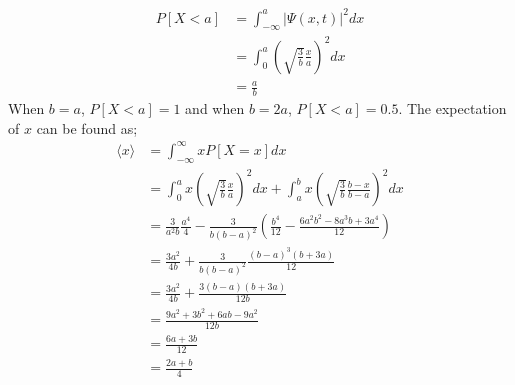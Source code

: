 \documentclass[addpoints]{exam}
\begin{document}
\begin{questions}
\begin{solution}
        \begin{align*}
            P[X<a] & = \int_{-\infty}^{a} {|\Psi(x,t)|}^2 dx                          \\
                   & = \int_{0}^{a} {\left(\sqrt{\frac{3}{b}}\frac{x}{a}\right)}^2 dx \\
                   & = \frac{a}{b}
        \end{align*}
        When $b = a$, $P[X<a] = 1$ and when $b = 2a$, $P[X<a] = 0.5$.
        The expectation of $x$ can be found as;
        \begin{align*}
            \langle x \rangle & = \int_{-\infty}^{\infty} xP[X=x] dx                                                                                                \\
                              & = \int_{0}^{a} x\left(\sqrt{\frac{3}{b}}\frac{x}{a}\right)^2 dx + \int_{a}^{b} x\left(\sqrt{\frac{3}{b}}\frac{b-x}{b-a}\right)^2 dx \\
                              & = \frac{3}{a^2b}\frac{a^4}{4} - \frac{3}{b(b-a)^2}\left(\frac{b^4}{12} -\frac{6a^2b^2 - 8a^3b + 3a^4}{12}\right)                    \\
                              & = \frac{3a^2}{4b} +  \frac{3}{b(b-a)^2}\frac{(b-a)^3(b+3a)}{12}                                                                     \\
                              & = \frac{3a^2}{4b} + \frac{3(b-a)(b+3a)}{12b}                                                                                        \\
                              & = \frac{9a^2 + 3b^2 + 6ab - 9a^2}{12b}                                                                                              \\
                              & = \frac{6a+3b}{12}                                                                                                                  \\
                              & = \frac{2a+b}{4}
        \end{align*}

    \end{solution}
\end{questions}
% 
\end{document}
